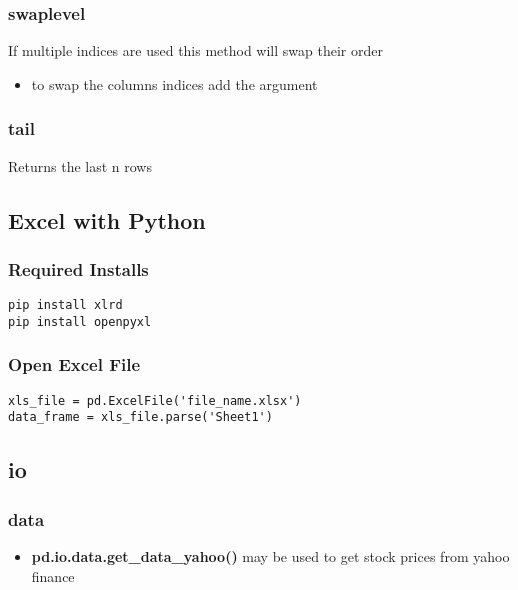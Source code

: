 %
\subsubsection{swaplevel}
If multiple indices are used this method will swap their order
  \begin{itemize}

    \item to swap the columns indices add the argument {\color{red}{axis=1}}
  \end{itemize}

%
\subsubsection{tail}
Returns the last n rows

\subsection{Excel with Python}

%
\subsubsection{Required Installs}
\begin{lstlisting}
pip install xlrd
pip install openpyxl
\end{lstlisting}

%
\subsubsection{Open Excel File}
\begin{lstlisting}
xls_file = pd.ExcelFile('file_name.xlsx')
data_frame = xls_file.parse('Sheet1')
\end{lstlisting}


\subsection{io}

%
\subsubsection{data}
  \begin{itemize}

    \item \textbf{pd.io.data.get\_data\_yahoo()} may be used to get stock prices
      from yahoo finance
  \end{itemize}

